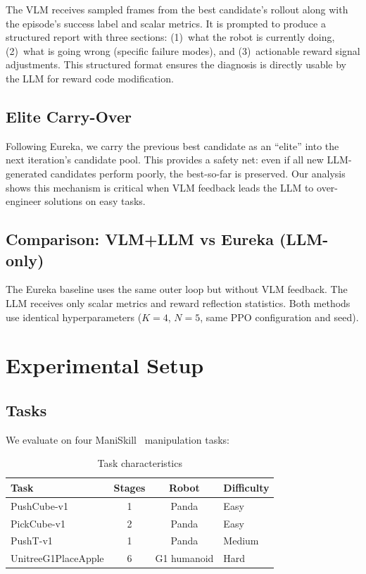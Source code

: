 \documentclass[conference]{IEEEtran}
\begin{document}
The VLM receives sampled frames from the best candidate's rollout along with
the episode's success label and scalar metrics. It is prompted to produce a
structured report with three sections: (1)~what the robot is currently doing,
(2)~what is going wrong (specific failure modes), and (3)~actionable reward
signal adjustments. This structured format ensures the diagnosis is directly
usable by the LLM for reward code modification.

\subsection{Elite Carry-Over}

Following Eureka, we carry the previous best candidate as an ``elite'' into the
next iteration's candidate pool. This provides a safety net: even if all new
LLM-generated candidates perform poorly, the best-so-far is preserved. Our
analysis shows this mechanism is critical when VLM feedback leads the LLM to
over-engineer solutions on easy tasks.

\subsection{Comparison: VLM+LLM vs Eureka (LLM-only)}

The Eureka baseline uses the same outer loop but without VLM feedback. The LLM
receives only scalar metrics and reward reflection statistics. Both methods use
identical hyperparameters ($K=4$, $N=5$, same PPO configuration and seed).


\section{Experimental Setup}

\subsection{Tasks}

We evaluate on four ManiSkill~\cite{maniskill} manipulation tasks:

\begin{table}[htbp]
\caption{Task characteristics}
\label{tab:tasks}
\centering
\begin{tabular}{lccl}
\toprule
Task & Stages & Robot & Difficulty \\
\midrule
PushCube-v1 & 1 & Panda & Easy \\
PickCube-v1 & 2 & Panda & Easy \\
PushT-v1 & 1 & Panda & Medium \\
UnitreeG1PlaceApple & 6 & G1 humanoid & Hard \\
\bottomrule
\end{tabular}
\end{table}
\end{document}
